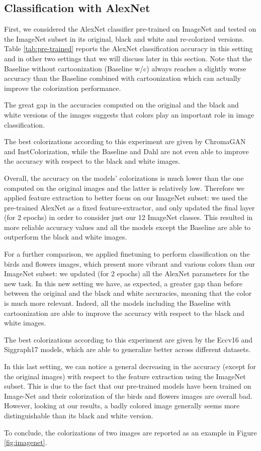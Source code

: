 \subsection{Classification with AlexNet}
First, we considered the AlexNet classifier pre-trained on ImageNet and tested on the ImageNet subset in its original, black and white and re-colorized versions. Table \ref{tab:pre-trained} reports the AlexNet classification accuracy in this setting and in other two settings that we will discuss later in this section. Note that the Baseline without cartoonization (Baseline w/c) always reaches a slightly worse accuracy than the Baseline combined with cartoonization which can actually improve the colorization performance.

The great gap in the accuracies computed on the original and the black and white versions of the images suggests that colors play an important role in image classification.

The best colorizations according to this experiment are given by ChromaGAN and InstColorization, while the Baseline and Dahl are not even able to improve the accuracy with respect to the black and white images.

Overall, the accuracy on the models' colorizations is much lower than the one computed on the original images and the latter is relatively low. Therefore we applied feature extraction to better focus on our ImageNet subset: we used the pre-trained AlexNet as a fixed feature-extractor, and only updated the final layer (for 2 epochs) in order to consider just our 12 ImageNet classes. This resulted in more reliable accuracy values and all the models except the Baseline are able to outperform the black and white images.

For a further comparison, we applied finetuning to perform classification on the birds and flowers images, which present more vibrant and various colors than our ImageNet subset: we updated (for 2 epochs) all the AlexNet parameters for the new task. In this new setting we have, as expected, a greater gap than before between the original and the black and white accuracies, meaning that the color is much more relevant. Indeed, all the models including the Baseline with cartoonization are able to improve the accuracy with respect to the black and white images.

The best colorizations according to this experiment are given by the Eccv16 and Siggraph17 models, which are able to generalize better across different datasets.

In this last setting, we can notice a general decreasing in the accuracy (except for the original images) with respect to the feature extraction using the ImageNet subset. This is due to the fact that our pre-trained models have been trained on Image-Net and their colorization of the birds and flowers images are overall bad. However, looking at our results, a badly colored image generally seems more distinguishable than its black and white version.

To conclude, the colorizations of two images are reported as an example in Figure \ref{fig:imagenet}.

